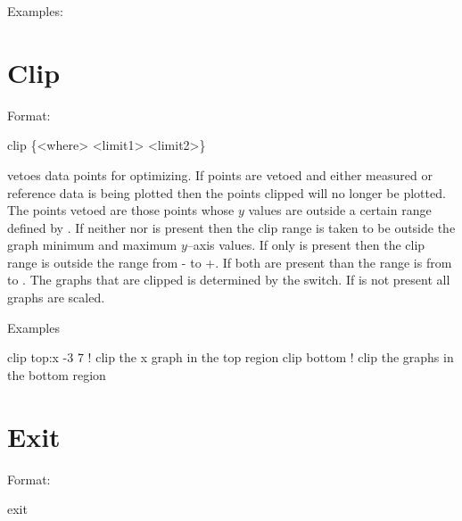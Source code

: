 Examples:


\section{Clip}
\label{s:clip}

Format:
\begin{example}
  clip \{<where> <limit1> <limit2>\}
\end{example}

\vskip 0.2in  vetoes data points for optimizing. If points are vetoed
and either measured or reference data is being plotted then the points clipped
will no longer be plotted. The points vetoed are those points whose $y$ values
are outside a certain range defined by  . If neither
 nor  is present then the clip range is taken to be
outside the graph minimum and maximum $y$--axis values. If only  is
present then the clip range is outside the range from - to
+. If both are present than the range is from  to
.  The graphs that are clipped is determined by the 
switch.  If  is not present all graphs are scaled.

Examples
\begin{example}
  clip top:x -3  7  ! clip the x graph in the top region
  clip bottom       ! clip the graphs in the bottom region
\end{example}

\section{Exit}
\label{s:exit}

Format:
\begin{example}
  exit
\end{example}

